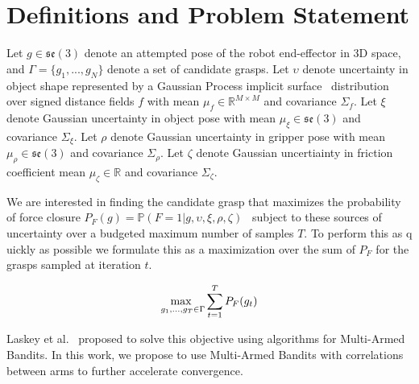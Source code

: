 \section{Definitions and Problem Statement}

Let $g \in \mathfrak{se}(3)$ denote an attempted pose of the robot end-effector in 3D space, and $\Gamma = \{ g_1, ..., g_N\}$ denote a set of candidate grasps.
Let $\upsilon$ denote uncertainty in object shape represented by a Gaussian Process implicit surface~\cite{} distribution over signed distance fields $f$ with mean $\mu_f \in \mathbb{R}^{M \times M}$ and covariance $\Sigma_f$.
Let $\xi$ denote Gaussian uncertainty in object pose with mean $\mu_{\xi} \in \mathfrak{se}(3)$ and covariance $\Sigma_{\xi}$.
Let $\rho$ denote Gaussian uncertainty in gripper pose with mean $\mu_{\rho} \in \mathfrak{se}(3)$ and covariance $\Sigma_{\rho}$.
Let $\zeta$ denote Gaussian uncertiainty in friction coefficient mean $\mu_{\zeta} \in \mathbb{R}$ and covariance $\Sigma_{\zeta}$.

We are interested in finding the candidate grasp that maximizes the probability of force closure $P_F(g) = \mathbb{P} \left( F = 1 \big| g, \upsilon, \xi, \rho, \zeta\right)$~\cite{} subject to these sources of uncertainty over a budgeted maximum number of samples $T$.
To perform this as q	uickly as possible we formulate this as a maximization over the sum of $P_F$ for the grasps sampled at iteration $t$.

\vspace{-2ex}
\begin{align*}
	\underset{g_1, ..., g_T \in \Gamma}{\text{max }} \sum \limits_{t=1}^T P_F(g_{t})
\end{align*}

\noindent Laskey et al.~\cite{} proposed to solve this objective using algorithms for Multi-Armed Bandits.
In this work, we propose to use Multi-Armed Bandits with correlations between arms to further accelerate convergence.
